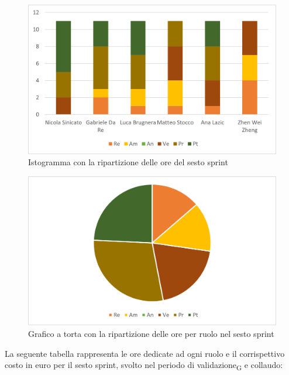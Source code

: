 \begin{figure}[H]
    \centering
    \includegraphics[scale=0.6]{img/grafi preventivo/istogrammi/validazione/periodo1.png}
    \caption{Istogramma con la ripartizione delle ore del sesto sprint}
\end{figure}
\begin{figure}[H]
    \centering
    \includegraphics[scale=0.6]{img/grafi preventivo/torta/validazione/periodo1.png}
    \caption{Grafico a torta con la ripartizione delle ore per ruolo nel sesto sprint}
\end{figure}
La seguente tabella rappresenta le ore dedicate ad ogni ruolo e il corrispettivo costo in euro per il sesto sprint, svolto nel periodo di validazione\textsubscript{G} e collaudo:

